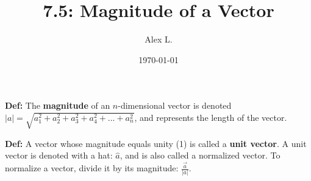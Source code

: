 \documentclass{article}
\title{7.5: Magnitude of a Vector}
\author{Alex L.}
\date{\today}
\begin{document}
\maketitle
\textbf{Def:} The \textbf{magnitude} of an $n$-dimensional vector is denoted $\vert a\vert = \sqrt{a_1^2 + a_2^2 + a_3^2 + a_4^2 + ... + a_n^2}$, and represents the length of the vector. 

\textbf{Def:} A vector whose magnitude equals unity (1) is called a \textbf{unit vector}. A unit vector is denoted with a hat: $\hat{a}$, and is also called a normalized vector. To normalize a vector, divide it by its magnitude: $\frac{\vec{a}}{\vert a\vert}$. 
\end{document}
